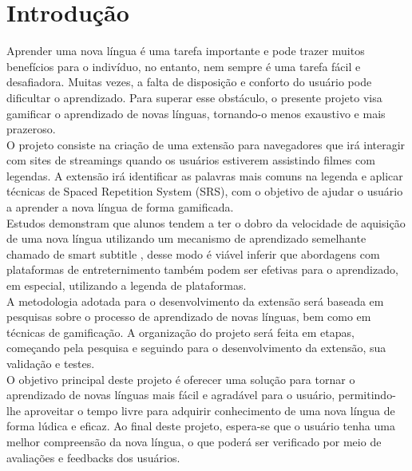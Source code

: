 \documentclass[12pt]{article}
\begin{document}
\section{Introdução}
Aprender uma nova língua é uma tarefa importante e pode trazer muitos benefícios para o indivíduo, no entanto, nem sempre é uma tarefa fácil e desafiadora. Muitas vezes, a falta de disposição e conforto do usuário pode dificultar o aprendizado. Para superar esse obstáculo, o presente projeto visa gamificar o aprendizado de novas línguas, tornando-o menos exaustivo e mais prazeroso.\\
O projeto consiste na criação de uma extensão para navegadores que irá interagir com sites de streamings quando os usuários estiverem assistindo filmes com legendas. A extensão irá identificar as palavras mais comuns na legenda e aplicar técnicas de Spaced Repetition System (SRS), com o objetivo de ajudar o usuário a aprender a nova língua de forma gamificada.\\
Estudos demonstram que alunos tendem a ter o dobro da velocidade de aquisição de uma nova língua utilizando um mecanismo de aprendizado semelhante chamado de smart subtitle \cite{Kovacs13}, desse modo é viável inferir que abordagens com plataformas de entreternimento também podem ser efetivas para o aprendizado, em especial, utilizando a legenda de plataformas. \\
A metodologia adotada para o desenvolvimento da extensão será baseada em pesquisas sobre o processo de aprendizado de novas línguas, bem como em técnicas de gamificação. A organização do projeto será feita em etapas, começando pela pesquisa e seguindo para o desenvolvimento da extensão, sua validação e testes.\\
O objetivo principal deste projeto é oferecer uma solução para tornar o aprendizado de novas línguas mais fácil e agradável para o usuário, permitindo-lhe aproveitar o tempo livre para adquirir conhecimento de uma nova língua de forma lúdica e eficaz. Ao final deste projeto, espera-se que o usuário tenha uma melhor compreensão da nova língua, o que poderá ser verificado por meio de avaliações e feedbacks dos usuários.
\end{document}
